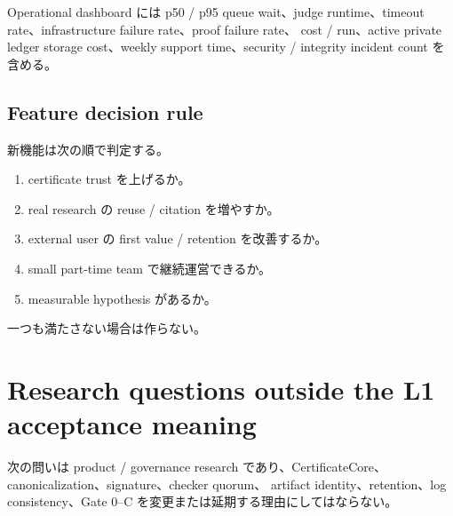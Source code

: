 \documentclass[a4paper,11pt]{ltjsarticle}
\begin{document}
Operational dashboard には p50 / p95 queue wait、judge runtime、timeout rate、infrastructure failure rate、proof failure rate、
cost / run、active private ledger storage cost、weekly support time、security / integrity incident count を含める。

\subsection{Feature decision rule}

新機能は次の順で判定する。

\begin{enumerate}
  \item certificate trust を上げるか。
  \item real research の reuse / citation を増やすか。
  \item external user の first value / retention を改善するか。
  \item small part-time team で継続運営できるか。
  \item measurable hypothesis があるか。
\end{enumerate}

一つも満たさない場合は作らない。

\section{Research questions outside the L1 acceptance meaning}

次の問いは product / governance research であり、CertificateCore、canonicalization、signature、checker quorum、
artifact identity、retention、log consistency、Gate 0--C を変更または延期する理由にしてはならない。
\end{document}

